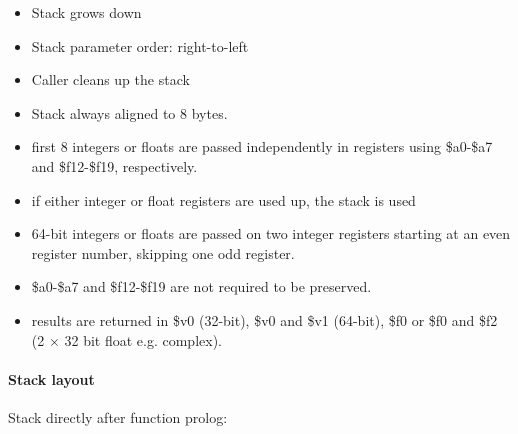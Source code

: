 \begin{itemize}
\item Stack grows down
\item Stack parameter order: right-to-left
\item Caller cleans up the stack
\item Stack always aligned to 8 bytes.
\item first 8 integers or floats are passed independently in registers using \$a0-\$a7 and \$f12-\$f19, respectively.
\item if either integer or float registers are used up, the stack is used
\item 64-bit integers or floats are passed on two integer registers starting at an even register number, skipping one odd register.
\item \$a0-\$a7 and \$f12-\$f19 are not required to be preserved.
\item results are returned in \$v0 (32-bit), \$v0 and \$v1 (64-bit), \$f0 or \$f0 and \$f2 (2 $\times$ 32 bit float e.g. complex).
\end{itemize}

\paragraph{Stack layout}

Stack directly after function prolog:\\

